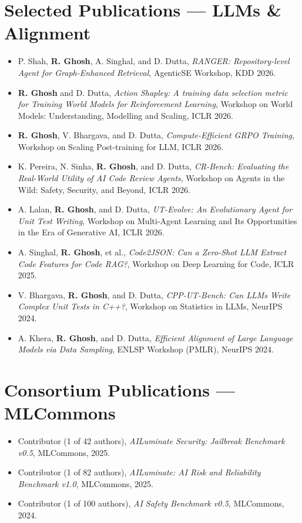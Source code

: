 \documentclass[10.5pt]{article}
\begin{document}
\section{Selected Publications --- LLMs \& Alignment}
\begin{itemize}
  \item P. Shah, \textbf{R. Ghosh}, A. Singhal, and D. Dutta, \textit{RANGER: Repository-level Agent for Graph-Enhanced Retrieval}, AgenticSE Workshop, KDD 2026.
  \item \textbf{R. Ghosh} and D. Dutta, \textit{Action Shapley: A training data selection metric for Training World Models for Reinforcement Learning}, Workshop on World Models: Understanding, Modelling and Scaling, ICLR 2026.
  \item \textbf{R. Ghosh}, V. Bhargava, and D. Dutta, \textit{Compute-Efficient GRPO Training}, Workshop on Scaling Post-training for LLM, ICLR 2026.
  \item K. Pereira, N. Sinha, \textbf{R. Ghosh}, and D. Dutta, \textit{CR-Bench: Evaluating the Real-World Utility of AI Code Review Agents}, Workshop on Agents in the Wild: Safety, Security, and Beyond, ICLR 2026.
  \item A. Lalan, \textbf{R. Ghosh}, and D. Dutta, \textit{UT-Evolve: An Evolutionary Agent for Unit Test Writing}, Workshop on Multi-Agent Learning and Its Opportunities in the Era of Generative AI, ICLR 2026.
  \item A. Singhal, \textbf{R. Ghosh}, et al., \textit{Code2JSON: Can a Zero-Shot LLM Extract Code Features for Code RAG?}, Workshop on Deep Learning for Code, ICLR 2025.
  \item V. Bhargava, \textbf{R. Ghosh}, and D. Dutta, \textit{CPP-UT-Bench: Can LLMs Write Complex Unit Tests in C++?}, Workshop on Statistics in LLMs, NeurIPS 2024.
  \item A. Khera, \textbf{R. Ghosh}, and D. Dutta, \textit{Efficient Alignment of Large Language Models via Data Sampling}, ENLSP Workshop (PMLR), NeurIPS 2024.
\end{itemize}

\section{Consortium Publications --- MLCommons}
\begin{itemize}
  \item Contributor (1 of 42 authors), \textit{AILuminate Security: Jailbreak Benchmark v0.5}, MLCommons, 2025.
  \item Contributor (1 of 82 authors), \textit{AILuminate: AI Risk and Reliability Benchmark v1.0}, MLCommons, 2025.
  \item Contributor (1 of 100 authors), \textit{AI Safety Benchmark v0.5}, MLCommons, 2024.
\end{itemize}
\end{document}
